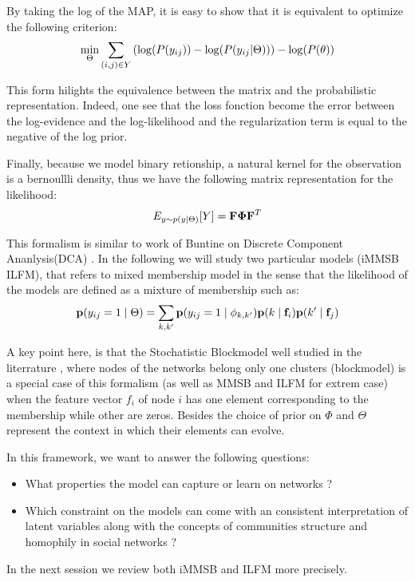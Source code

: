 By taking the log of the MAP, it is easy to show that it is equivalent to optimize the following criterion:
\begin{displaymath}
    \min\limits_{\Theta} \sum_{(i,j) \in Y} \left( \log(P(y_{ij})) - \log(P(y_{ij}|\Theta))\right) - \log(P(\theta))
\end{displaymath}


This form hilights the equivalence between the matrix and the probabilistic representation. Indeed, one see that the loss fonction become the error between the log-evidence and the log-likelihood and the regularization term is equal to the negative of the log prior.


Finally, because we model binary retionship, a natural kernel for the observation is a bernoullli density, thus we have the following matrix representation for the likelihood:
\begin{equation}
E_{y \sim p(y \mid \Theta)}[Y] = \mathbf{F} \mathbf{\Phi}  \mathbf{F}^T
\end{equation}

This formalism is similar to work of Buntine on Discrete Component Ananlysis(DCA) \cite{DCA}. In the following we will study two particular models (iMMSB ILFM), that refers to mixed membership model in the sense that the likelihood of the models are defined as a mixture of membership such as:
\begin{equation}
\mathbf{p}(y_{ij}=1 \mid \Theta ) = \sum_{k, k'} \mathbf{p}(y_{ij}=1\mid\phi_{k,k'}) \mathbf{p}(k \mid \mathbf{f}_i) \mathbf{p}(k' \mid \mathbf{f}_j)
\end{equation}

A key point here, is that the Stochatistic Blockmodel well studied in the literrature \cite{goldenberg2010survey}, where nodes of the networks belong only one clusters (blockmodel) is a special case of this formalism (as well as MMSB and ILFM for extrem case) when the feature vector $f_i$ of node $i$ has one element corresponding to the membership while other are zeros. Besides the choice of prior on $\Phi$ and $\Theta$ represent the context in which  their elements can evolve.

In this framework, we want to answer the following questions:
\begin{itemize}
	\item What properties the model can capture or learn on networks ?
	\item Which constraint on the models can come with an consistent interpretation of latent variables along with the concepts of communities structure and homophily in social networks  ?
\end{itemize} 


In the next session we review both iMMSB and ILFM more precisely.

